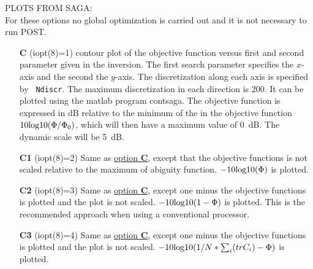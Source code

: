 \documentclass{saclantc}
\begin{document}
\noindent PLOTS FROM  {\sf SAGA}: \\
For these options no global optimization is carried out and it is not necessary to run {\sc POST}. 

\vspace{-0.6cm}
\begin{itemize}
    \item[{\bf C}] (iopt(8)=1) contour plot of the objective function
versus first and second parameter given in the inversion. The first
search parameter specifies the $x$-axis and the second the
$y$-axis. The discretization along each axis is specified by {\tt
Ndiscr}. The maximum discretization in each direction is 200.
It can be  plotted using the matlab program {\sf contsaga}.
The objective function is expressed in dB relative to the minimum of
the in the objective function $10 { \rm log10} (\Phi/\Phi_0)$, which will
then have a maximum value of 0~dB. The dynamic scale will be 5~dB. 
 \vspace{-0.3cm}    \item[{\bf C1}] (iopt(8)=2) 
Same as \underline{option {\bf C}}, except that the objective functions
 is not scaled relative to the maximum of abiguity function.  $-10 { \rm log10} (\Phi)$ is plotted.
 \vspace{-0.3cm}    \item[{\bf C2}] (iopt(8)=3) 
Same as \underline{option {\bf C}}, except one minus the objective functions
 is plotted and the plot is not scaled. $-10 { \rm log10} (1-\Phi)$ is plotted.
This is the recommended approach when using a conventional processor.
 \vspace{-0.3cm}    \item[{\bf C3}] (iopt(8)=4) 
Same as \underline{option {\bf C}}, except one minus the objective functions
 is plotted and the plot is not scaled. $-10 { \rm log10} (1/N*\sum_{i} (trC_i)-\Phi)$ is plotted.


\end{itemize}
\end{document}
